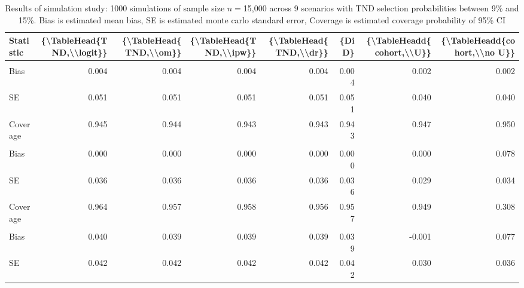 \begin{table}

\caption{Results of simulation study: 1000 simulations of sample size $n=$15,000 across 9 scenarios with TND selection probabilities between 9\% and 15\%. Bias is estimated mean bias, SE is estimated monte carlo standard error, Coverage is estimated coverage probability of 95\% CI}
\centering
\begin{tabular}[t]{lddddddd}
\toprule
Statistic & \{\textbackslash{}TableHead\{TND,\textbackslash{}\textbackslash{}logit\}\} & \{\textbackslash{}TableHead\{TND,\textbackslash{}\textbackslash{}om\}\} & \{\textbackslash{}TableHead\{TND,\textbackslash{}\textbackslash{}ipw\}\} & \{\textbackslash{}TableHead\{TND,\textbackslash{}\textbackslash{}dr\}\} & \{DiD\} & \{\textbackslash{}TableHeadd\{cohort,\textbackslash{}\textbackslash{}U\}\} & \{\textbackslash{}TableHeadd\{cohort,\textbackslash{}\textbackslash{}no U\}\}\\
\midrule
\addlinespace[0.3em]
\\
\hspace{1em}Bias & 0.004 & 0.004 & 0.004 & 0.004 & 0.004 & 0.002 & 0.002\\
\hspace{1em}SE & 0.051 & 0.051 & 0.051 & 0.051 & 0.051 & 0.040 & 0.040\\
\hspace{1em}Coverage & 0.945 & 0.944 & 0.943 & 0.943 & 0.943 & 0.947 & 0.950\\
\addlinespace[0.3em]
\\
\hspace{1em}Bias & 0.000 & 0.000 & 0.000 & 0.000 & 0.000 & 0.000 & 0.078\\
\hspace{1em}SE & 0.036 & 0.036 & 0.036 & 0.036 & 0.036 & 0.029 & 0.034\\
\hspace{1em}Coverage & 0.964 & 0.957 & 0.958 & 0.956 & 0.957 & 0.949 & 0.308\\
\addlinespace[0.3em]
\\
\hspace{1em}Bias & 0.040 & 0.039 & 0.039 & 0.039 & 0.039 & -0.001 & 0.077\\
\hspace{1em}SE & 0.042 & 0.042 & 0.042 & 0.042 & 0.042 & 0.030 & 0.036\\

\end{tabular}
\end{table}

